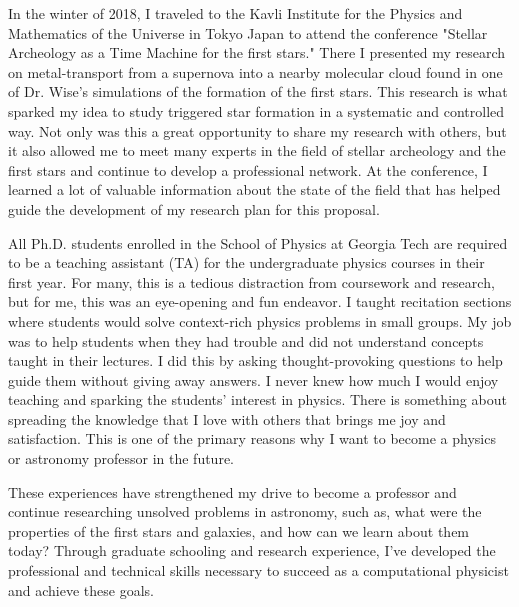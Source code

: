 \documentclass[letterpaper, 12pt]{article}
\begin{document}
In the winter of 2018, I traveled to the Kavli Institute for the Physics and Mathematics of the Universe in Tokyo Japan to attend the conference "Stellar Archeology as a Time Machine for the first stars." There I presented my research on metal-transport from a supernova into a nearby molecular cloud found in one of Dr. Wise's simulations of the formation of the first stars. This research is what sparked my idea to study triggered star formation in a systematic and controlled way. Not only was this a great opportunity to share my research with others, but it also allowed me to meet many experts in the field of stellar archeology and the first stars and continue to develop a professional network. At the conference, I learned a lot of valuable information about the state of the field that has helped guide the development of my research plan for this proposal.

All Ph.D. students enrolled in the School of Physics at Georgia Tech are required to be a teaching assistant (TA) for the undergraduate physics courses in their first year. For many, this is a tedious distraction from coursework and research, but for me, this was an eye-opening and fun endeavor. I taught recitation sections where students would solve context-rich physics problems in small groups. My job was to help students when they had trouble and did not understand concepts taught in their lectures. I did this by asking thought-provoking questions to help guide them without giving away answers. I never knew how much I would enjoy teaching and sparking the students' interest in physics. There is something about spreading the knowledge that I love with others that brings me joy and satisfaction. This is one of the primary reasons why I want to become a physics or astronomy professor in the future.

These experiences have strengthened my drive to become a professor and continue researching unsolved problems in astronomy, such as, what were the properties of the first stars and galaxies, and how can we learn about them today? Through graduate schooling and research experience, I’ve developed the professional and technical skills necessary to succeed as a computational physicist and achieve these goals.

\end{document}
